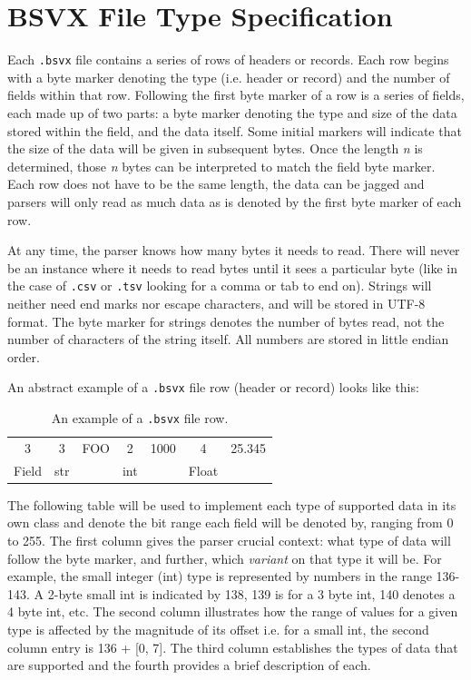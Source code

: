 \documentclass[10pt]{article}
\begin{document}
\section*{BSVX File Type Specification}

Each \texttt{.bsvx} file contains a series of rows of headers or records.
Each row begins with a byte marker denoting the type (i.e. header or record) and the number of fields within that row.
Following the first byte marker of a row is a series of fields, each made up of two parts: a byte marker denoting the type and size of the data stored within the field, and the data itself.
Some initial markers will indicate that the size of the data will be given in subsequent bytes.
Once the length \textit{n} is determined, those \textit{n} bytes can be interpreted to match the field byte marker.
Each row does not have to be the same length, the data can be jagged and parsers will only read as much data as is denoted by the first byte marker of each row. 

\indent{}
At any time, the parser knows how many bytes it needs to read.
There will never be an instance where it needs to read bytes until it sees a particular byte (like in the case of \texttt{.csv} or \texttt{.tsv} looking for a comma or tab to end on).
Strings will neither need end marks nor escape characters, and will be stored in UTF-8 format.
The byte marker for strings denotes the number of bytes read, not the number of characters of the string itself.
All numbers are stored in little endian order.

\indent{}
An abstract example of a \texttt{.bsvx} file row (header or record) looks like this:

\begin{table}[H]
\centering
\begin{tabular}{|c|c|c|c|c|c|c|}
\hline
3 & 3 & FOO & 2 & 1000 & 4 & 25.345 \\
Field & str &  & int &  & Float &  \\ \hline
\end{tabular}
\caption{An example of a \texttt{.bsvx} file row.}
\label{tab:bsvxApproach_example}
\end{table}

\indent{}
The following table will be used to implement each type of supported data in its own class and denote the bit range each field will be denoted by, ranging from 0 to 255.
The first column gives the parser crucial context: what type of data will follow the byte marker, and further, which \textit{variant} on that type it will be.
For example, the small integer (int) type is represented by numbers in the range 136-143. 
A 2-byte small int is indicated by 138, 139 is for a 3 byte int, 140 denotes a 4 byte int, etc.
The second column illustrates how the range of values for a given type is affected by the magnitude of its offset i.e. for a small int, the second column entry is 136 + [0, 7].
The third column establishes the types of data that are supported and the fourth provides a brief description of each.
\end{document}
